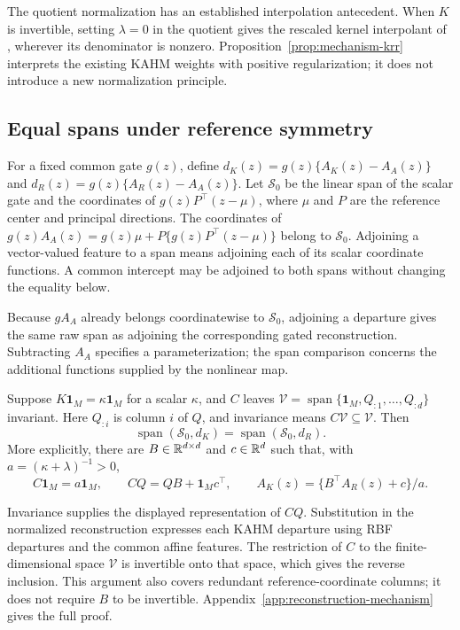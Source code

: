 The quotient normalization has an established interpolation antecedent.
When $K$ is invertible, setting $\lambda=0$ in the quotient gives the
rescaled kernel interpolant of \citet{DeMarchi2017Rescaled}, wherever
its denominator is nonzero. Proposition~\ref{prop:mechanism-krr}
interprets the existing KAHM weights with positive regularization;
it does not introduce a new normalization principle.

\subsection{Equal spans under reference symmetry}

For a fixed common gate $g(z)$, define
$d_K(z)=g(z)\{A_K(z)-A_A(z)\}$ and
$d_R(z)=g(z)\{A_R(z)-A_A(z)\}$. Let $\mathcal S_0$ be the linear
span of the scalar gate and the coordinates of
$g(z)P^\top(z-\mu)$, where $\mu$ and $P$ are the reference center
and principal directions. The coordinates of
$g(z)A_A(z)=g(z)\mu+P\{g(z)P^\top(z-\mu)\}$ belong to
$\mathcal S_0$. Adjoining a vector-valued feature to a span means
adjoining each of its scalar coordinate functions. A common intercept
may be adjoined to both spans without changing the equality below.

Because $gA_A$ already belongs coordinatewise to $\mathcal S_0$,
adjoining a departure gives the same raw span as adjoining the
corresponding gated reconstruction. Subtracting $A_A$ specifies a
parameterization; the span comparison concerns the additional functions
supplied by the nonlinear map.

\begin{proposition}
\label{prop:mechanism-redundancy}
Suppose $K\mathbf1_M=\kappa\mathbf1_M$ for a scalar $\kappa$, and
$C$ leaves
$\mathcal V=\operatorname{span}\{\mathbf1_M,Q_{:1},\ldots,Q_{:d}\}$
invariant. Here $Q_{:i}$ is column $i$ of $Q$, and invariance means
$C\mathcal V\subseteq\mathcal V$. Then
\[
 \operatorname{span}(\mathcal S_0,d_K)
 =\operatorname{span}(\mathcal S_0,d_R).
\]
More explicitly, there are $B\in\mathbb{R}^{d\times d}$ and $c\in\mathbb{R}^d$
such that, with $a=(\kappa+\lambda)^{-1}>0$,
\[
 C\mathbf1_M=a\mathbf1_M,\qquad
 CQ=QB+\mathbf1_Mc^\top,\qquad
 A_K(z)=\{B^\top A_R(z)+c\}/a.
\]
\end{proposition}

Invariance supplies the displayed representation of $CQ$. Substitution
in the normalized reconstruction expresses each KAHM departure using
RBF departures and the common affine features. The restriction of $C$
to the finite-dimensional space $\mathcal V$ is invertible onto that
space, which gives the reverse inclusion. This argument also covers
redundant reference-coordinate columns; it does not require $B$ to be
invertible. Appendix~\ref{app:reconstruction-mechanism} gives the full
proof.

